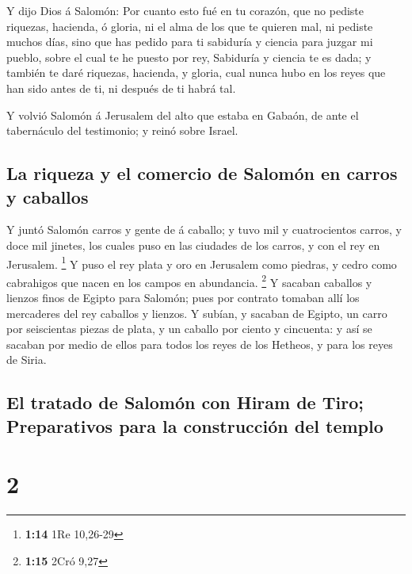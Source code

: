  Y dijo Dios á Salomón: Por cuanto esto fué en tu corazón,
que no pediste riquezas, hacienda, ó gloria, ni el alma de los que te
quieren mal, ni pediste muchos días, sino que has pedido para ti
sabiduría y ciencia para juzgar mi pueblo, sobre el cual te he puesto
por rey,  Sabiduría y ciencia te es dada; y también te daré
riquezas, hacienda, y gloria, cual nunca hubo en los reyes que han sido
antes de ti, ni después de ti habrá tal.

 Y volvió Salomón á Jerusalem del alto que estaba en
Gabaón, de ante el tabernáculo del testimonio; y reinó sobre Israel.

\hypertarget{la-riqueza-y-el-comercio-de-salomuxf3n-en-carros-y-caballos}{%
\subsection{La riqueza y el comercio de Salomón en carros y
caballos}\label{la-riqueza-y-el-comercio-de-salomuxf3n-en-carros-y-caballos}}

 Y juntó Salomón carros y gente de á caballo; y tuvo mil y
cuatrocientos carros, y doce mil jinetes, los cuales puso en las
ciudades de los carros, y con el rey en Jerusalem. \footnote{\textbf{1:14}
  1Re 10,26-29}  Y puso el rey plata y oro en Jerusalem
como piedras, y cedro como cabrahigos que nacen en los campos en
abundancia. \footnote{\textbf{1:15} 2Cró 9,27}  Y sacaban
caballos y lienzos finos de Egipto para Salomón; pues por contrato
tomaban allí los mercaderes del rey caballos y lienzos.  Y
subían, y sacaban de Egipto, un carro por seiscientas piezas de plata, y
un caballo por ciento y cincuenta: y así se sacaban por medio de ellos
para todos los reyes de los Hetheos, y para los reyes de Siria.

\hypertarget{el-tratado-de-salomuxf3n-con-hiram-de-tiro-preparativos-para-la-construcciuxf3n-del-templo}{%
\subsection{El tratado de Salomón con Hiram de Tiro; Preparativos para
la construcción del
templo}\label{el-tratado-de-salomuxf3n-con-hiram-de-tiro-preparativos-para-la-construcciuxf3n-del-templo}}

\hypertarget{section-1}{%
\section{2}\label{section-1}}


